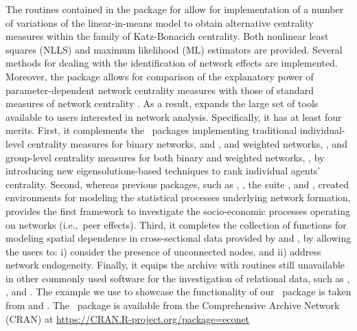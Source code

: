 \documentclass[nojss]{jss}
\begin{document}
The routines contained in the package  \citep{econet} for 
\citep{R} allow for implementation of a number of variations of the
linear-in-means model to obtain alternative centrality measures within the
family of Katz-Bonacich centrality.  Both nonlinear least squares (NLLS) and
maximum likelihood (ML) estimators are provided.  Several methods for
dealing with the identification of network effects are implemented. 
Moreover, the  package allows for comparison of the explanatory
power of parameter-dependent network centrality measures with those of
standard measures of network centrality \citep{Wasserman+Faust:1994}.  As a
result,  expands the large set of tools available to
 users interested in network analysis.  Specifically, it has at
least four merits.  First, it complements the ~packages
implementing traditional individual-level centrality measures for binary
networks,  \citep{igraph} and  \citep{sna}, and
weighted networks,  \citep{tnet}, and group-level centrality
measures for both binary and weighted networks, 
\citep{An+Liu:2016}, by introducing new eigensolutions-based
techniques to rank individual agents' centrality.  Second, whereas previous
packages, such as  \citep{btergm},  \citep{hergm},
the  suite \citep{statnet}, and  \citep{xergm},
created environments for modeling the statistical processes underlying
network formation,  provides the first framework to investigate
the socio-economic processes operating on networks (i.e.,~peer effects). 
Third, it completes the collection of functions for modeling spatial
dependence in cross-sectional data provided by  \citep{spdep} and
 \citep{splm}, by allowing the users to: i) consider the presence
of unconnected nodes, and ii) address network endogeneity.  Finally, it
equips the  archive with routines still unavailable in other
commonly used software for the investigation of relational data, such as
 \citep{MATLAB},  \citep{Batagelj:2003},
 \citep{Python} and  \citep{Stata}.  The
example we use to showcase the functionality of our ~package is
taken from \cite{Battaglini+Patacchini:2018} and
\cite{Battaglini+Sciabolazza+Patacchini:2020}.  The ~package
 \citep{econet} is available from the Comprehensive  Archive Network (CRAN) at
\url{https://CRAN.R-project.org/package=econet}
\end{document}
